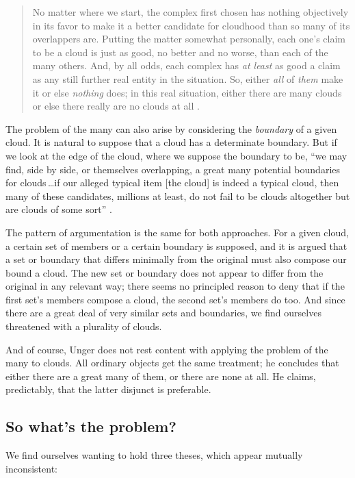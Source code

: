 \documentclass[11pt]{article}
\newenvironment{squote}{%
	\begin{quote}\begin{singlespace}%
	}{%
	\end{singlespace}\end{quote}}
\begin{document}
\begin{spacing}{1.5}
\begin{squote}
No matter where we start, the complex first chosen has nothing
objectively in its favor to make it a better candidate for cloudhood
than so many of its overlappers are.  Putting the matter somewhat
personally, each one's claim to be a cloud is just as good, no better
and no worse, than each of the many others.  And, by all odds, each
complex has \emph{at least} as good a claim as any still further real
entity in the situation.  So, either \emph{all} of \emph{them} make it
or else \emph{nothing} does; in this real situation, either there are
many clouds or else there really are no clouds at all
\citep[415--??]{unger1980a}.
\end{squote}

The problem of the many can also arise by considering the {\em
  boundary} of a given cloud.  It is natural to suppose that a cloud
has a determinate boundary.  But if we look at the edge of the cloud,
where we suppose the boundary to be, ``we may find, side by side, or
themselves overlapping, a great many potential boundaries for
clouds\,\ldots if our alleged typical item {[}the cloud{]} is indeed
a typical cloud, then many of these candidates, millions at least, do
not fail to be clouds altogether but are clouds of some
sort'' \citep[420--421]{unger1980a}.

The pattern of argumentation is the same for both approaches.  For a
given cloud, a certain set of members or a certain boundary is
supposed, and it is argued that a set or boundary that differs
minimally from the original must also compose our bound a cloud.  The
new set or boundary does not appear to differ from the original in any
relevant way; there seems no principled reason to deny that if the
first set's members compose a cloud, the second set's members do too.
And since there are a great deal of very similar sets and boundaries,
we find ourselves threatened with a plurality of clouds.

And of course, Unger does not rest content with applying the problem
of the many to clouds.  All ordinary objects get the same treatment;
he concludes that either there are a great many of them, or there are
none at all.  He claims, predictably, that the latter disjunct is
preferable.

\subsection{So what's the problem?}
We find ourselves wanting to hold three theses, which appear mutually
inconsistent:


\end{spacing}
\end{document}
